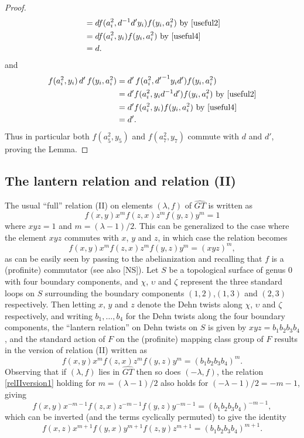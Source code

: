 \documentclass[a4paper,10pt,reqno]{amsart}
\newcommand\GT{\widehat{GT}}
\begin{document}
\begin{proof}
\begin{align*}
&=df(a_i^2,d^{-1}d'y_i)f(y_i,a_i^2)\hbox{ by }\eqref{useful2}\\
&=df(a_i^2,y_i)f(y_i,a_i^2)\hbox{ by }\eqref{useful4}\\
&=d.
\end{align*}
and
\begin{align*}
f(a_i^2,y_i)\,d'\,f(y_i,a_i^2)&=d'\,f(a_i^2,{d'}^{-1}y_id')f(y_i,a_i^2)\\
&=d'f(a_i^2,y_id^{-1}d')f(y_i,a_i^2)\hbox{ by }\eqref{useful2}\\
&=d'f(a_i^2,y_i)f(y_i,a_i^2)\hbox{ by }\eqref{useful4}\\
&={d'}.
\end{align*}
Thus in particular both $f(a_5^2,y_5)$ and $f(a_7^2,y_7)$ commute with $d$ and $d'$, proving
the Lemma.
\end{proof}

\subsection{The lantern relation and relation (II)}

The usual ``full'' relation (II) on elements $(\lambda,f)$ of $\GT$ is written as
$$f(x,y)x^mf(z,x)z^mf(y,z)y^m=1$$ 
where $xyz=1$ and $m=(\lambda-1)/2$. This can be generalized to the case where the element 
$xyz$ commutes with $x$, $y$ and $z$, in which case the relation becomes
\begin{equation}\label{relIIversion0}
f(x,y)x^m f(z,x)z^m f(y,z)y^m=(xyz)^m,
\end{equation}
as can be easily seen by passing to the abelianization and recalling that $f$ is a (profinite)
commutator (see also [NS]). Let $S$ be a topological surface of genus $0$ with four boundary components,
and $\chi$, $\upsilon$ and $\zeta$ represent the three standard loops on $S$ surrounding the
boundary components $(1,2)$,$(1,3)$ and $(2,3)$ respectively. Then letting $x$, $y$ and $z$
denote the Dehn twists along $\chi$, $\upsilon$ and $\zeta$ respectively, 
and writing $b_1,\ldots,b_4$ for the Dehn twists along the four
boundary components, the ``lantern relation'' on Dehn twists on $S$ is given by $xyz=b_1b_2b_3b_4$,
and the standard action of $F$ on the (profinite) mapping class group of $F$ results in
the version of relation (II) written as
\begin{equation}\label{relIIversion1}
f(x,y)x^m f(z,x)z^m f(y,z)y^m=(b_1b_2b_3b_4)^m.
\end{equation}
Observing that if $(\lambda,f)$ lies in $\GT$ then so does $(-\lambda,f)$, the relation 
\eqref{relIIversion1} holding for $m=(\lambda-1)/2$ also holds for $(-\lambda-1)/2=-m-1$, giving
\begin{equation}\label{relIIversion2}
f(x,y)x^{-m-1} f(z,x)z^{-m-1} f(y,z)y^{-m-1}=(b_1b_2b_3b_4)^{-m-1},
\end{equation}
which can be inverted (and the terms cyclically permuted) to give the identity
\begin{equation}\label{relIIversion3}
f(x,z)x^{m+1}f(y,x)y^{m+1}f(z,y)z^{m+1}=(b_1b_2b_3b_4)^{m+1}.
\end{equation}
\end{document}
